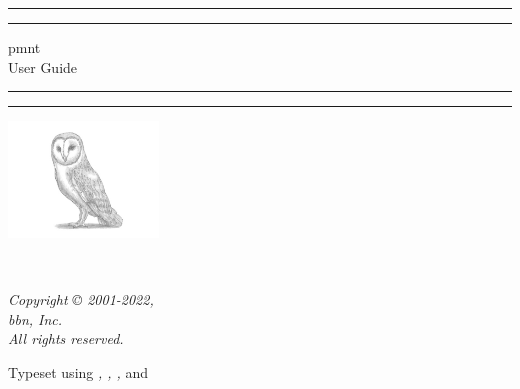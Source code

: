 
\begin{titlepage}
	\centering

	\vspace*{\baselineskip}

	\rule{\textwidth}{1.6pt}\vspace*{-\baselineskip}\vspace*{2pt}
	\rule{\textwidth}{0.4pt}

	\vspace{0.75\baselineskip}

	{\LARGE\acl{pmnt}\\User Guide\\}

	\vspace{0.75\baselineskip}

	\rule{\textwidth}{0.4pt}\vspace*{-\baselineskip}\vspace{3.2pt}
	\rule{\textwidth}{1.6pt}

	\vspace{2\baselineskip}

	\includegraphics[width=0.3\textwidth]{includes/BarnOwl.jpeg}

	\vspace*{4\baselineskip}

	{\Large\theauthor\\}

	\vspace{0.5\baselineskip}

	\textit{\thedate}

	\vfill

	\textit{Copyright © 2001-2022,\\
	\acl{bbn}, Inc.\\
	All rights reserved.}

	{\footnotesize Typeset using \emph{\mainfont, \sansfont, \monofont,} and \emph{\mathfont}}
\end{titlepage}
\tableofcontents
\listoffigures
\listoftables
